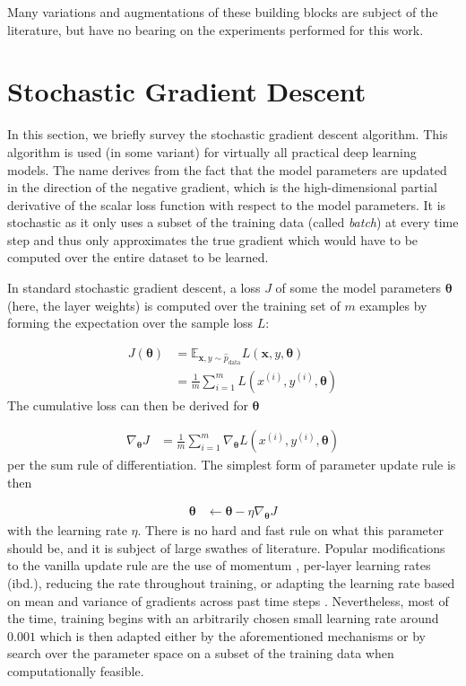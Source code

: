 Many variations and augmentations of these building blocks are subject of the
literature, but have no bearing on the experiments performed for this work.

\section{Stochastic Gradient Descent}%
\label{sec:review_stochastic_gradient_descent}

In this section, we briefly survey the stochastic gradient descent algorithm.
This algorithm is used (in some variant) for virtually all practical deep
learning models. The name derives from the fact that the model parameters are
updated in the direction of the negative gradient, which is the high-dimensional
partial derivative of the scalar loss function with respect to the model
parameters. It is stochastic as it only uses a subset of the training data
(called \emph{batch}) at every time step and thus only approximates the true
gradient which would have to be computed over the entire dataset to be learned.

In standard stochastic gradient descent, a loss $J$ of some the
model parameters $\boldsymbol\theta$ (here, the layer weights) is computed over the training set of $m$
examples by forming the expectation over the sample loss $L$:

\begin{align}
    J(\boldsymbol\theta) &= \mathbb{E}_{\mathbf{x},y\sim\hat{p}_{\text{data}}} L(\mathbf{x}, y, \boldsymbol\theta) \\
                         &= \frac{1}{m}\sum_{i=1}^{m}L(x^{(i)}, y^{(i)}, \boldsymbol\theta)
\end{align}
The cumulative loss can then be derived for $\boldsymbol\theta$

\begin{align}
    \nabla_{\boldsymbol\theta}J &= \frac{1}{m}\sum_{i=1}^{m}\nabla_{\boldsymbol\theta}L(x^{(i)}, y^{(i)}, \boldsymbol\theta)
\end{align}
per the sum rule of differentiation. The simplest form of parameter update rule
is then

\begin{align}
    \boldsymbol\theta &\leftarrow \boldsymbol\theta - \eta \nabla_{\boldsymbol\theta}J
\end{align}
with the learning rate $\eta$. There is no hard and fast rule on what this
parameter should be, and it is subject of large swathes of literature. Popular
modifications to the vanilla update rule are the use of momentum
\citep{jacobs1988increased}, per-layer learning rates (ibd.), reducing the rate
throughout training, or adapting the
learning rate based on mean and variance of gradients across past time steps
\citep{kingma2014adam}. Nevertheless, most of the time, training begins with an
arbitrarily chosen small learning rate around $0.001$ which is then adapted
either by the aforementioned mechanisms or by search over the parameter space on
a subset of the training data when computationally feasible.


